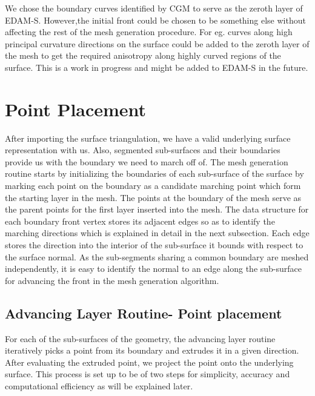 We chose the boundary curves identified by CGM to serve as the zeroth layer of EDAM-S. However,the initial front could be chosen to be something else without affecting the rest of the mesh generation procedure. For eg. curves along high principal curvature directions on the surface could be added to the zeroth layer of the mesh to get the required anisotropy along highly curved regions of the surface. This is a work in progress and might be added to EDAM-S in the future.

\section{Point Placement}

After importing the surface triangulation, we have a valid underlying surface representation with us. Also, segmented sub-surfaces and their boundaries provide us with the boundary we need to march off of. The mesh generation routine starts by initializing the boundaries of each sub-surface of the surface by marking each point on the boundary as a candidate marching point which form the starting layer in the mesh. The points at the boundary of the mesh serve as the parent points for the first layer inserted into the mesh. The data structure for each boundary front vertex stores its adjacent edges so as to identify the marching directions which is explained in detail in the next subsection. Each edge stores the direction into the interior of the sub-surface it bounds with respect to the surface normal. As the sub-segments sharing a common boundary are meshed independently, it is easy to identify the normal to an edge along the sub-surface for advancing the front in the mesh generation algorithm.

\subsection{Advancing Layer Routine- Point placement} \label{advancing-layer}

For each of the sub-surfaces of the geometry, the advancing layer routine iteratively picks a point from its boundary and extrudes it in a given direction. After evaluating the extruded point, we project the point onto the underlying surface. This process is set up to be of two steps for simplicity, accuracy and computational efficiency as will be explained later.

